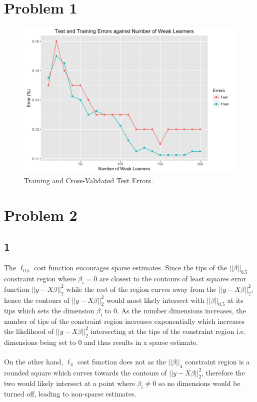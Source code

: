 \documentclass[twoside]{Homework}
\begin{document}
\maketitle

\section*{Problem 1}
\begin{figure}[!ht]
  \centering
    \includegraphics[scale=0.25]{Error_Plot}
  \caption{Training and Cross-Validated Test Errors.}
\end{figure}

\newpage
\section*{Problem 2}
\subsection*{1}
The $\ell_{0.5}$ cost function encourages sparse estimates. Since the tips of the $||\beta||_{0.5}$ constraint region where $\beta_i = 0$ are closest to the contours of least squares error function $||y - X\beta||^2_2$ while the rest of the region curves away from the $||y - X\beta||^2_2$, hence the contours of $||y - X\beta||^2_2$ would most likely intersect with $||\beta||_{0.5}$ at its tips which sets the dimension $\beta_i$ to 0. As the number dimensions increases, the number of tips of the constraint region increases exponentially which increases the likelihood of $||y - X\beta||^2_2$ intersecting at the tips of the constraint region i.e. dimensions being set to 0 and thus results in a sparse estimate.\\
\\\noindent
On the other hand, $\ell_{4}$ cost function does not as the $||\beta||_{4}$ constraint region is a rounded square which curves towards the contours of $||y - X\beta||^2_2$, therefore the two would likely intersect at a point where $\beta_i \neq 0$ so no dimensions would be turned off, leading to non-sparse estimates.
\end{document}
